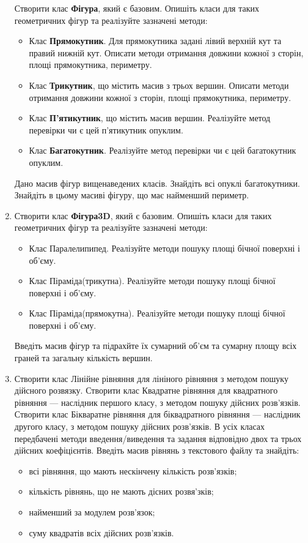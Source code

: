 \documentclass[a5paper,titlepage,openany,twoside,draft]{book_unv}%
\begin{document}
\begin{enumerate}
Створити клас \textbf{Фігура}, який є базовим.  Опишіть класи для 
таких геометричних фігур та реалізуйте зазначені методи:
\begin{itemize}
\item
Клас \textbf{Прямокутник}. 
Для прямокутника задані лівий верхній кут та правий нижній кут.
Описати методи отримання довжини кожної з сторін, площі прямокутника,
периметру. 
\item
Клас \textbf{ Трикутник}, що містить масив з трьох вершин. 
Описати методи отримання довжини кожної з сторін, площі прямокутника,
периметру. 
\item
Клас \textbf{ П'ятикутник}, що містить масив вершин. 
Реалізуйте метод перевірки чи є цей п'ятикутник опуклим.
\item
Клас \textbf{ Багатокутник}. 
Реалізуйте метод перевірки чи є цей багатокутник опуклим.
\end{itemize}
Дано масив фігур вищенаведених класів. Знайдіть всі опуклі багатокутники.
Знайдіть в цьому масиві фігуру, що має найменший периметр.

\item

Створити клас \textbf{Фігура3D}, який є базовим.  Опишіть класи для 
таких геометричних фігур та реалізуйте зазначені методи:
\begin{itemize}
\item
  Клас Паралелипипед. Реалізуйте методи пошуку площі бічної поверхні і
  об'єму.
\item
  Клас Піраміда(трикутна). Реалізуйте методи пошуку площі бічної поверхні і
  об'єму.
\item
  Клас Піраміда(прямокутна). Реалізуйте методи пошуку площі бічної поверхні і
  об'єму.
\end{itemize}
Введіть масив фігур та підрахйте їх сумарний об'єм та сумарну площу всіх граней 
та загальну кількість вершин.

\item
Створити клас Лінійне рівняння для лініного рівняння з методом пошуку дійсного розвязку.
Створити клас Квадратне рівняння для квадратного рівняння --- наслідник першого класу,
з методом пошуку дійсних розв'язків.
Створити клас Бікваратне рівняння для біквадратного рівняння --- наслідник другого класу,
з методом пошуку дійсних розв'язків. В усіх класах передбачені методи введення/виведення та задання 
відповідно двох та трьох дійсних коефіцієнтів.
Введіть масив рівнянь з текстового файлу та знайдіть:
\begin{itemize}
\item
всі рівняння, що мають нескінчену кількість розв'язків;
\item
кількість рівнянь, що не мають дісних розвя'зків;
\item
найменший за модулем розв'язок;
\item
суму квадратів всіх дійсних розв'язків.
\end{itemize}


\end{enumerate}
\end{document}
